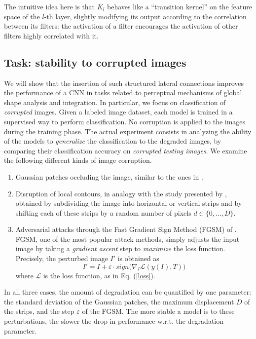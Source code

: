 \documentclass[11pt,oneside,reqno]{amsart}
\begin{document}
 The intuitive idea here is that $K_l$ behaves like a ``transition kernel'' on the feature space of the $l$-th layer, slightly modifying its output according to the correlation between its filters: the activation of a filter encourages the activation of other filters highly correlated with it.
 
 
 \subsection{Task: stability to corrupted images}\label{task}
 
 We will show that the insertion of such structured lateral connections improves the performance of a CNN in tasks related to perceptual mechanisms of global shape analysis and integration. In particular, we focus on classification of \emph{corrupted} images. Given a labeled image dataset, each model is trained in a supervised way to perform classification. No corruption is applied to the images during the training phase. The actual experiment consists in analyzing the ability of the models to \emph{generalize} the classification to the degraded images, by comparing their classification accuracy on \emph{corrupted testing images}. We examine the following different kinds of image corruption.
 \begin{enumerate}
  \item Gaussian patches occluding the image, similar to the ones in \citet{tang}.
  \item Disruption of local contours, in analogy with the study presented by \citet{baker}, obtained by subdividing the image into horizontal or vertical strips and by shifting each of these strips by a random number of pixels $d \in \{0,\ldots,D\}$.
  \item Adversarial attacks through the Fast Gradient Sign Method (FGSM) of \citet{fgsm}. FGSM, one of the most popular attack methods, simply adjusts the input image by taking a \emph{gradient ascent} step to \emph{maximize} the loss function. Precisely, the perturbed image $I'$ is obtained as
 \begin{equation}\label{attack} I' = I + \varepsilon \cdot sign\big( \nabla_I \mathcal{L}(y(I),T) \big)\end{equation}
 where $\mathcal{L}$ is the loss function, as in Eq. (\ref{loss}).
 \end{enumerate}
 In all three cases, the amount of degradation can be quantified by one parameter: the standard deviation of the Gaussian patches, the maximum displacement $D$ of the strips, and the step $\varepsilon$ of the FGSM. The more stable a model is to these perturbations, the slower the drop in performance w.r.t. the degradation parameter.
\end{document}
